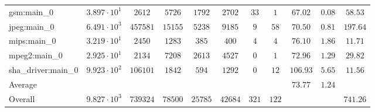 \begin{tabular}{|l|c|c|c|c|c|c|c|c|c|c|}
gsm:main\_0             & $ 3.897 \cdot 10^{1} $ & $ 2612   $ & $ 5726  $ & $ 1792  $ & $ 2702  $ & $ 33  $ & $ 1   $ & $ 67.02       $ & $ 0.08    $ & $ 58.53   $ \\
jpeg:main\_0            & $ 6.491 \cdot 10^{3} $ & $ 457581 $ & $ 15155 $ & $ 5238  $ & $ 9185  $ & $ 9   $ & $ 58  $ & $ 70.50       $ & $ 0.81    $ & $ 197.64  $ \\
mips:main\_0            & $ 3.219 \cdot 10^{1} $ & $ 2450   $ & $ 1283  $ & $ 385   $ & $ 400   $ & $ 4   $ & $ 4   $ & $ 76.10       $ & $ 1.86    $ & $ 11.71   $ \\
mpeg2:main\_0           & $ 2.925 \cdot 10^{1} $ & $ 2134   $ & $ 7208  $ & $ 2613  $ & $ 4527  $ & $ 0   $ & $ 1   $ & $ 72.96       $ & $ 1.29    $ & $ 29.82   $ \\
sha\_driver:main\_0     & $ 9.923 \cdot 10^{2} $ & $ 106101 $ & $ 1842  $ & $ 594   $ & $ 1292  $ & $ 0   $ & $ 12  $ & $ 106.93      $ & $ 5.65    $ & $ 11.56   $ \\
\hline
Average                 & $                    $ & $        $ & $       $ & $       $ & $       $ & $     $ & $     $ & $ 73.77       $ & $ 1.24    $ & $         $ \\
\hline
Overall                 & $ 9.827 \cdot 10^{3} $ & $ 739324 $ & $ 78500 $ & $ 25785 $ & $ 42684 $ & $ 321 $ & $ 122 $ & $             $ & $         $ & $ 741.26  $ \\
\hline
\end{tabular}
